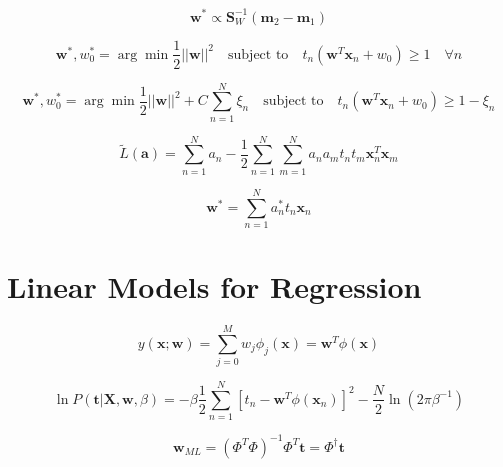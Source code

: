 \documentclass{article}
\begin{document}
\begin{equation}
    \mathbf{w}^* \propto \mathbf{S}_W^{-1} (\mathbf{m}_2 - \mathbf{m}_1)
\end{equation}

\begin{equation}
    \mathbf{w}^*, w_0^* = \arg\min \frac{1}{2} ||\mathbf{w}||^2 \quad \text{subject to} \quad t_n(\mathbf{w}^T \mathbf{x}_n + w_0) \ge 1 \quad \forall n
\end{equation}

\begin{equation}
    \mathbf{w}^*, w_0^* = \arg\min \frac{1}{2} ||\mathbf{w}||^2 + C \sum_{n=1}^N \xi_n \quad \text{subject to} \quad t_n(\mathbf{w}^T \mathbf{x}_n + w_0) \ge 1 - \xi_n
\end{equation}

\begin{equation}
    \tilde{L}(\mathbf{a}) = \sum_{n=1}^N a_n - \frac{1}{2} \sum_{n=1}^N \sum_{m=1}^N a_n a_m t_n t_m \mathbf{x}_n^T \mathbf{x}_m
\end{equation}

\begin{equation}
    \mathbf{w}^* = \sum_{n=1}^N a_n^* t_n \mathbf{x}_n
\end{equation}


\section{Linear Models for Regression}

\begin{equation}
    y(\mathbf{x}; \mathbf{w}) = \sum_{j=0}^M w_j \phi_j(\mathbf{x}) = \mathbf{w}^T \phi(\mathbf{x})
\end{equation}

\begin{equation}
    \ln P(\mathbf{t} | \mathbf{X}, \mathbf{w}, \beta) = -\beta \frac{1}{2} \sum_{n=1}^N[t_n - \mathbf{w}^T \phi(\mathbf{x}_n)]^2 - \frac{N}{2} \ln(2\pi\beta^{-1})
\end{equation}

\begin{equation}
    \mathbf{w}_{ML} = (\Phi^T \Phi)^{-1} \Phi^T \mathbf{t} = \Phi^\dagger \mathbf{t}
\end{equation}
\end{document}
